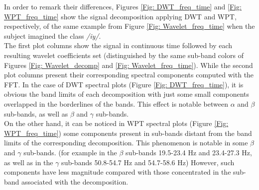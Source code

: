 In order to remark their differences, Figures \ref{Fig: DWT_freq_time} and \ref{Fig: WPT_freq_time} show the signal decomposition applying DWT and WPT, respectively, of the same example from Figure \ref{Fig: Wavelet_freq_time} when the subject imagined the class \textit{/iy/}.\\

The first plot columns show the signal in continuous time followed by each resulting wavelet coefficients set (distinguished by the same sub-band colors of Figures \ref{Fig: Wavelet_decomp} and \ref{Fig: Wavelet_freq_time}). While the second plot columns present their corresponding spectral components computed with the FFT. In the case of DWT spectral plots (Figure \ref{Fig: DWT_freq_time}), it is obvious the band limits of each decomposition with just some small components overlapped in the borderlines of the bands. This effect is notable between $\alpha$ and $\beta$ sub-bands, as well as $\beta$ and $\gamma$ sub-bands.\\

On the other hand, it can be noticed in WPT spectral plots (Figure \ref{Fig: WPT_freq_time}) some components present in sub-bands distant from the band limits of the corresponding decomposition. This phenomenon is notable in some $\beta$ and $\gamma$ sub-bands. (for example in the $\beta$ sub-bands 19.5-23.4 Hz and 23.4-27.3 Hz, as well as in the $\gamma$ sub-bands 50.8-54.7 Hz and 54.7-58.6 Hz) However, such components have less magnitude compared with those concentrated in the sub-band associated with the decomposition.\\

